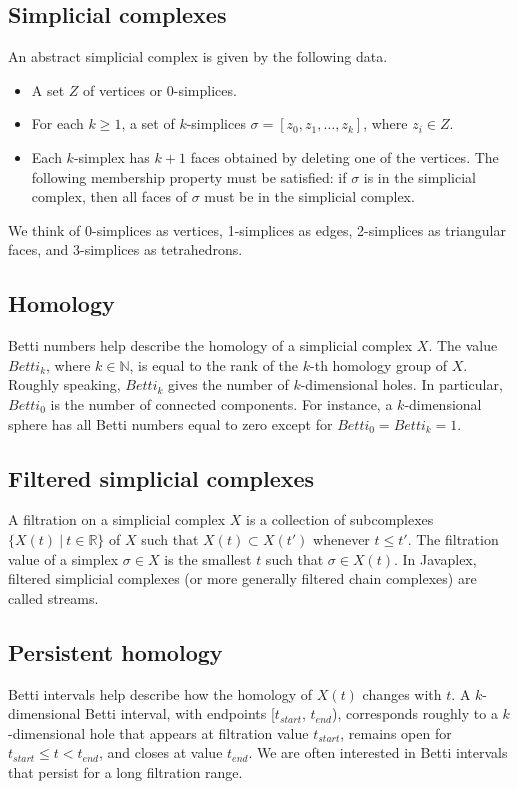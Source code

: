 \documentclass[amscd, amssymb, verbatim]{amsart}[12pt]
\theoremstyle{remark}
\theoremstyle{remark}
\theoremstyle{remark}
\newcommand{\N}{\mathbb{N}}
\newcommand{\R}{\mathbb{R}}
\begin{document}
\subsection{Simplicial complexes}
An abstract simplicial complex is given by the following data.
\begin{itemize}
\item A set $Z$ of vertices or 0-simplices.
\item For each $k\geq 1$, a set of $k$-simplices $\sigma = [z_0,z_1,\ldots,z_k]$, where $z_i\in Z$.
\item Each $k$-simplex has $k+1$ faces obtained by deleting one of the vertices. The following membership property must be satisfied: if $\sigma$ is in the simplicial complex, then all faces of $\sigma$ must be in the simplicial complex.
\end{itemize}
We think of 0-simplices as vertices, 1-simplices as edges, 2-simplices as triangular faces, and 3-simplices as tetrahedrons. 


\subsection{Homology}
Betti numbers help describe the homology of a simplicial complex $X$. The value $Betti_k$, where $k\in \N$, is equal to the rank of the $k$-th homology group of $X$. Roughly speaking, $Betti_k$ gives the number of $k$-dimensional holes. In particular, $Betti_0$ is the number of connected components. For instance, a $k$-dimensional sphere has all Betti numbers equal to zero except for $Betti_0 = Betti_k = 1$. 


\subsection{Filtered simplicial complexes}
A filtration on a simplicial complex $X$ is a collection of subcomplexes $\{X(t) \ |\ t\in \R\}$ of $X$ such that $X(t) \subset X(t')$ whenever $t\leq t'$. The filtration value of a simplex $\sigma \in X$ is the smallest $t$ such that $\sigma \in X(t)$. In Javaplex, filtered simplicial complexes (or more generally filtered chain complexes) are called streams. 


\subsection{Persistent homology}
Betti intervals help describe how the homology of $X(t)$ changes with $t$. A $k$-dimensional Betti interval, with endpoints [$t_{start}$, $t_{end}$), corresponds roughly to a $k$-dimensional hole that appears at filtration value $t_{start}$, remains open for $t_{start} \leq t < t_{end}$, and closes at value $t_{end}$. We are often interested in Betti intervals that persist for a long filtration range. 
\end{document}
